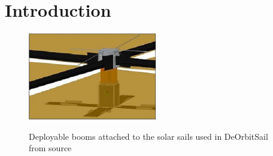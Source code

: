 \section{Introduction}

\begin{figure}
  \begin{center}
    \includegraphics[width=0.5\textwidth]{images/satellitesail.JPG}\\
  \end{center}
  \caption{Deployable booms attached to the solar sails used in DeOrbitSail from source \cite{ESA}}
  \label{fig:sail}
\end{figure}


